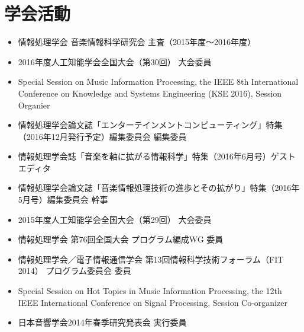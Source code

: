 \section*{学会活動}
\begin{itemize}
  
\item 
情報処理学会 音楽情報科学研究会 主査（2015年度〜2016年度）\par

\item 
2016年度人工知能学会全国大会（第30回） 大会委員\par

\item 
Special Session on Music Information Processing, the IEEE 8th International Conference on Knowledge and Systems Engineering (KSE 2016), Session Organier\par

\item 
情報処理学会論文誌「エンターテインメントコンピューティング」特集（2016年12月発行予定）編集委員会 編集委員\par

\item 
情報処理学会誌「音楽を軸に拡がる情報科学」特集（2016年6月号）ゲストエディタ\par

\item 
情報処理学会論文誌「音楽情報処理技術の進歩とその拡がり」特集（2016年5月号）編集委員会 幹事\par

\item 
2015年度人工知能学会全国大会（第29回） 大会委員\par

\item 
情報処理学会 第76回全国大会 プログラム編成WG 委員\par

\item 
情報処理学会／電子情報通信学会 第13回情報科学技術フォーラム（FIT 2014） プログラム委員会 委員\par

\item 
Special Session on Hot Topics in Music Information Processing, the 12th IEEE International Conference on Signal Processing, Session Co-organizer\par

\item 
日本音響学会2014年春季研究発表会 実行委員\par


\end{itemize}
